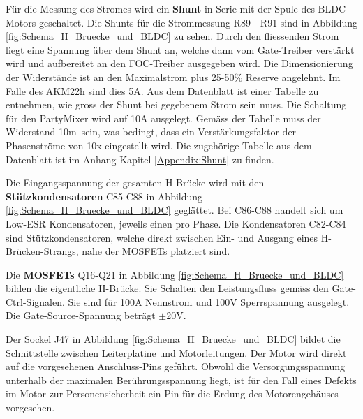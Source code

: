 Für die Messung des Stromes wird ein \textbf{Shunt} in Serie mit der Spule des BLDC-Motors geschaltet.
Die Shunts für die Strommessung R89 - R91 sind in Abbildung \ref{fig:Schema_H_Bruecke_und_BLDC} zu sehen. Durch den fliessenden Strom liegt eine Spannung über dem Shunt an, welche dann vom Gate-Treiber verstärkt wird und aufbereitet an den FOC-Treiber ausgegeben wird. Die Dimensionierung der Widerstände ist an den Maximalstrom plus 25-50\% Reserve angelehnt. Im Falle des AKM22h sind dies 5A. Aus dem Datenblatt ist einer Tabelle zu entnehmen, wie gross der Shunt bei gegebenem Strom sein muss. Die Schaltung für den PartyMixer wird auf 10A ausgelegt. Gemäss der Tabelle muss der Widerstand 10m\textOmega\ sein, was bedingt, dass ein Verstärkungsfaktor der Phasenströme von 10x eingestellt wird. Die zugehörige Tabelle aus dem Datenblatt ist im Anhang Kapitel \ref{Appendix:Shunt} zu finden. \cite[S.31]{trinamicmotion_control_gmbh__co_kg_tmc6200_2019}

Die Eingangsspannung der gesamten H-Brücke wird mit den \textbf{Stützkondensatoren} C85-C88 in Abbildung \ref{fig:Schema_H_Bruecke_und_BLDC} geglättet.
Bei C86-C88 handelt sich um Low-ESR Kondensatoren, jeweils einen pro Phase.
Die Kondensatoren C82-C84 sind Stützkondensatoren, welche direkt zwischen Ein- und Ausgang eines H-Brücken-Strangs, nahe der MOSFETs platziert sind.

Die \textbf{MOSFETs} Q16-Q21 in Abbildung \ref{fig:Schema_H_Bruecke_und_BLDC} bilden die eigentliche H-Brücke. Sie Schalten den Leistungsfluss gemäss den Gate-Ctrl-Signalen. Sie sind für 100A Nennstrom und 100V Sperrspannung ausgelegt. Die Gate-Source-Spannung beträgt $\pm$20V.

Der Sockel J47 in Abbildung \ref{fig:Schema_H_Bruecke_und_BLDC} bildet die Schnittstelle zwischen Leiterplatine und Motorleitungen. Der Motor wird direkt auf die vorgesehenen Anschluss-Pins geführt. Obwohl die Versorgungsspannung unterhalb der maximalen Berührungsspannung liegt, ist für den Fall eines Defekts im Motor zur Personensicherheit ein Pin für die Erdung des Motorengehäuses vorgesehen.